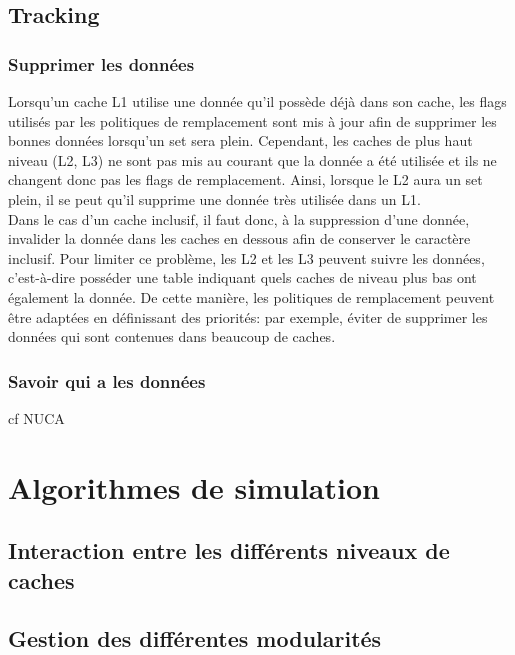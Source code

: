 \documentclass[a4paper]{article}
\begin{document}
\subsection{Tracking}
\subsubsection{Supprimer les données}
\indent Lorsqu'un cache L1 utilise une donnée qu'il possède déjà dans son cache, les flags utilisés par les politiques de remplacement sont mis à jour afin de supprimer les bonnes données lorsqu'un set sera plein. Cependant, les caches de plus haut niveau (L2, L3) ne sont pas mis au courant que la donnée a été utilisée et ils ne changent donc pas les flags de remplacement. Ainsi, lorsque le L2 aura un set plein, il se peut qu'il supprime une donnée très utilisée dans un L1. \\

\indent Dans le cas d'un cache inclusif, il faut donc, à la suppression d'une donnée, invalider la donnée dans les caches en dessous afin de conserver le caractère inclusif. Pour limiter ce problème, les L2 et les L3 peuvent suivre les données, c'est-à-dire posséder une table indiquant quels caches de niveau plus bas ont également la donnée. De cette manière, les politiques de remplacement peuvent être adaptées en définissant des priorités: par exemple, éviter de supprimer les données qui sont contenues dans beaucoup de caches.

\subsubsection{Savoir qui a les données}
\indent cf NUCA

\newpage
\section{Algorithmes de simulation}

\subsection{Interaction entre les différents niveaux de caches}

\subsection{Gestion des différentes modularités}

\newpage
\nocite{*}


\end{document}
